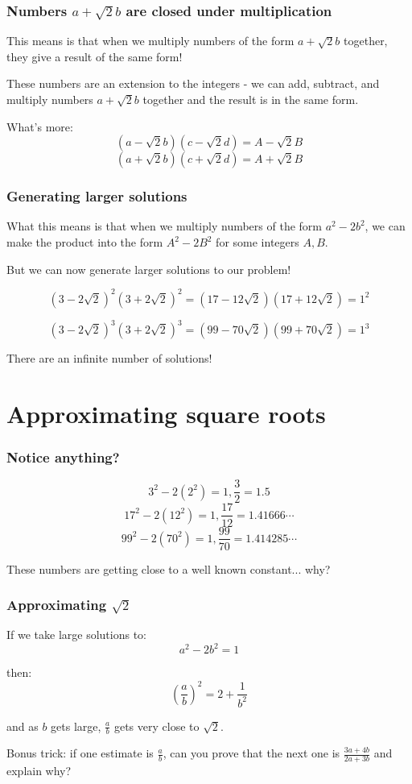 \documentclass[t]{beamer}
\begin{document}
\begin{frame}
	\frametitle{Numbers $a+\sqrt{2}b$ are closed under multiplication}

	This means is that when we multiply numbers of the form $a+\sqrt{2}b$ 
	together, they give a result of the same form!

	\vspace{1em}
	These numbers are an extension to the integers - we can add, subtract,
	and multiply numbers $a+\sqrt{2}b$ together and the result is in the
	same form.

	\vspace{1em}
	What's more: 
	\[(a-\sqrt{2}b)(c-\sqrt{2}d) = A-\sqrt{2}B \]
	\[(a+\sqrt{2}b)(c+\sqrt{2}d) = A+\sqrt{2}B \]

\end{frame}

\begin{frame}
	\frametitle{Generating larger solutions}
	What this means is that when we multiply numbers of the form $a^2-2b^2$,
	we can make the product into the form $A^2 - 2B^2$ for some integers $A,B$.

	But we can now generate larger solutions to our problem!

	\[ (3-2\sqrt{2})^2(3+2\sqrt{2})^2 = (17 - 12\sqrt{2})(17 + 12\sqrt{2}) = 1^2 \]

	\[ (3-2\sqrt{2})^3(3+2\sqrt{2})^3 = (99 - 70\sqrt{2})(99 + 70\sqrt{2}) = 1^3 \]

	There are an infinite number of solutions!
\end{frame}


\section{Approximating square roots}

\begin{frame}
        \frametitle{Notice anything?}
	\[3^2 - 2(2^2) = 1, \frac{3}{2} = 1.5 \]
	\[17^2 - 2(12^2) = 1, \frac{17}{12} = 1.41666\cdots \]
	\[99^2 - 2(70^2) = 1, \frac{99}{70} = 1.414285\cdots \]

	These numbers are getting close to a well known constant... why?
\end{frame}

\begin{frame}
	\frametitle{Approximating $\sqrt{2}$}

	If we take large solutions to:
	\[ a^2 - 2b^2 = 1 \]

	then:
	\[ \left(\frac{a}{b}\right)^2 = 2 + \frac{1}{b^2} \]

	and as $b$ gets large, $\frac{a}{b}$ gets very close to $\sqrt{2}$.

	\vspace{1em}
	Bonus trick: if one estimate is $\frac{a}{b}$, can you prove that the 
	next one is $\frac{3a+4b}{2a+3b}$ and explain why?
\end{frame}
\end{document}
